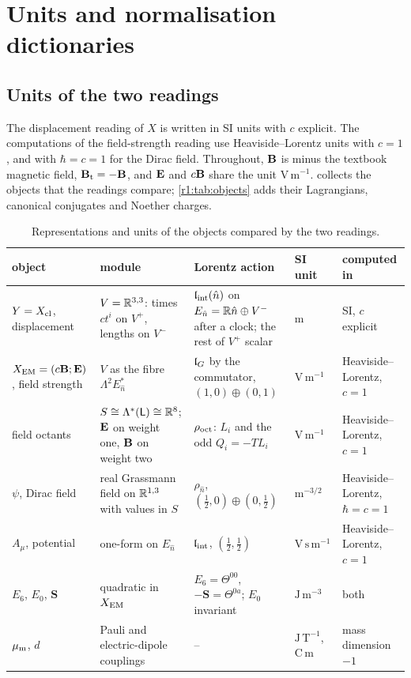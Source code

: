 \chapter{Units and normalisation dictionaries}
\label{app:units}

\section{Units of the two readings}
\label{app:units:readings}

The displacement reading of $X$ is written in SI units with $c$ explicit. The computations of the field-strength reading use
Heaviside--Lorentz units with $c=1$, and with $\hbar=c=1$ for the Dirac field. Throughout, $\mathbf B$ is minus the textbook magnetic field,
$\mathbf B_{\rm t}=-\mathbf B$, and $\mathbf E$ and $c\mathbf B$ share the unit $\mathrm{V\,m^{-1}}$.  collects the objects that the readings
compare; \cref{r1:tab:objects} adds their Lagrangians, canonical conjugates and Noether charges.

\begin{table}[ht]
\centering\small
\begin{tabular}{@{}>{\raggedright\arraybackslash}p{2.3cm}>{\raggedright\arraybackslash}p{3.1cm}>{\raggedright\arraybackslash}p{3.6cm}>{\raggedright\arraybackslash}p{1.6cm}>{\raggedright\arraybackslash}p{3.0cm}@{}}
\toprule
object & module & Lorentz action & SI unit & computed in\\
\midrule
$Y=X_{\rm cl}$, displacement & $V=\mathbb{R}^{3,3}$: times $ct^i$ on $V^+$, lengths on $V^-$ & $\mathfrak l_{\rm int}(\hat n)$ on $E_{\hat n}=\mathbb{R}\hat n\oplus V^-$ after a clock; the rest of $V^+$ scalar & m & SI, $c$ explicit\\
$X_{\rm EM}=(c\mathbf B;\mathbf E)$, field strength & $V$ as the fibre $\Lambda^2E_{\hat n}^*$ & $\mathfrak l_G$ by the commutator, $(1,0)\oplus(0,1)$ & $\mathrm{V\,m^{-1}}$ & Heaviside--Lorentz, $c=1$\\
field octants & $S\cong\Lambda^*(\mathsf L)\cong\mathbb{R}^8$; $\mathbf E$ on weight one, $\mathbf B$ on weight two & $\rho_{\rm oct}$: $L_i$ and the odd $Q_i=-TL_i$ & $\mathrm{V\,m^{-1}}$ & Heaviside--Lorentz, $c=1$\\
$\psi$, Dirac field & real Grassmann field on $\mathbb{R}^{1,3}$ with values in $S$ & $\rho_{\hat n}$, $(\tfrac12,0)\oplus(0,\tfrac12)$ & $\mathrm m^{-3/2}$ & Heaviside--Lorentz, $\hbar=c=1$\\
$A_\mu$, potential & one-form on $E_{\hat n}$ & $\mathfrak l_{\rm int}$, $(\tfrac12,\tfrac12)$ & $\mathrm{V\,s\,m^{-1}}$ & Heaviside--Lorentz, $c=1$\\
$E_6$, $E_0$, $\mathbf S$ & quadratic in $X_{\rm EM}$ & $E_6=\Theta^{00}$, $-\mathbf S=\Theta^{0a}$; $E_0$ invariant & $\mathrm{J\,m^{-3}}$ & both\\
$\mu_{\rm m}$, $d$ & Pauli and electric-dipole couplings & -- & $\mathrm{J\,T^{-1}}$, $\mathrm{C\,m}$ & mass dimension $-1$\\
\bottomrule
\end{tabular}
\caption{Representations and units of the objects compared by the two readings.}
\label{tab:app:units}\label{r9:tab:dict}
\end{table}

